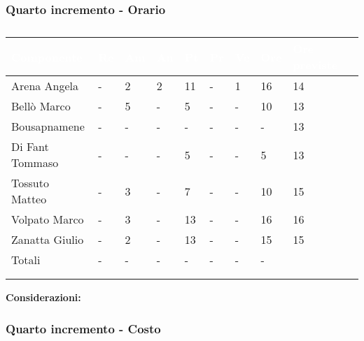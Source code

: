 {{        \subsubsection{Quarto incremento - Orario} {
            \setlength{\freewidth}{\dimexpr\textwidth-30\tabcolsep}
            \renewcommand{\arraystretch}{1.0}
            \setlength{\aboverulesep}{0pt}
            \setlength{\belowrulesep}{0pt}
            \begin{longtable}{C{.3\freewidth} C{.1\freewidth} C{.1\freewidth} C{.1\freewidth} C{.1\freewidth} C{.1\freewidth} C{.1\freewidth} C{.1\freewidth} C{.1\freewidth} C{.3\freewidth}}
            \toprule
            \textcolor{white}{\textbf{Componente}}&
            \textcolor{white}{\textbf{Re}}&
            \textcolor{white}{\textbf{Am}}&
            \textcolor{white}{\textbf{An}}&
            \textcolor{white}{\textbf{Pt}}&
            \textcolor{white}{\textbf{Pr}}&
            \textcolor{white}{\textbf{Ve}}&
            \textcolor{white}{\textbf{Ore}}&
            \textcolor{white}{\textbf{Ore previste}} \\
            \toprule
            \endhead
    
            Arena Angela & - & 2 & 2  & 11 & - & 1 & 16 & 14\\      
            Bellò Marco & - & 5 & - & 5 & - & - & 10 & 13\\      
            Bousapnamene & - & - & - & - & - & - & - & 13\\      
            Di Fant Tommaso & - & - & - & 5 & - & - & 5 & 13\\      
            Tossuto Matteo & - & 3 & - & 7 & - & - & 10 & 15\\      
            Volpato Marco & - & 3 & - & 13 & - & - & 16 & 16 \\      
            Zanatta Giulio & - & 2 & - & 13 & - & - & 15 & 15 \\      
            Totali & - & - & - & - & - & - & - \\
            \bottomrule
            \\
            \caption{}
    
            \end{longtable} 
            \textbf{Considerazioni:} 
        }
        \subsubsection{Quarto incremento - Costo} {}

}}
